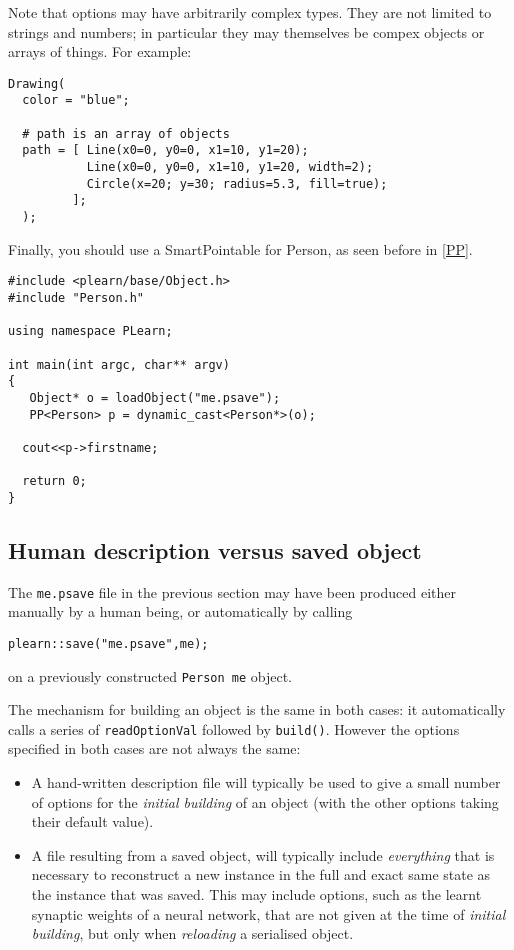 \documentclass[11pt]{book}
\begin{document}
Note that options may have arbitrarily complex types. They are not limited to strings and numbers; in particular they may
themselves be compex objects or arrays of things. For example:

\begin{verbatim}
Drawing(
  color = "blue";

  # path is an array of objects
  path = [ Line(x0=0, y0=0, x1=10, y1=20); 
           Line(x0=0, y0=0, x1=10, y1=20, width=2);
           Circle(x=20; y=30; radius=5.3, fill=true);
         ];
  );
\end{verbatim}

Finally, you should use a SmartPointable for Person, as seen before in \ref{PP}.

\begin{verbatim}
#include <plearn/base/Object.h>
#include "Person.h"

using namespace PLearn;

int main(int argc, char** argv)
{
   Object* o = loadObject("me.psave"); 
   PP<Person> p = dynamic_cast<Person*>(o);

  cout<<p->firstname;

  return 0;
}
\end{verbatim}


\subsection{Human description versus saved object} 

The {\tt me.psave} file in the previous section may have been produced
either manually by a human being, or automatically by calling 
\begin{verbatim}
plearn::save("me.psave",me);
\end{verbatim}
on a previously constructed {\tt Person me} object.

The mechanism for building an object is the same in both cases: it automatically calls a series of {\tt readOptionVal} followed by {\tt build()}. However the options specified in both cases are not always the same:

\begin{itemize}
\item A hand-written description file will typically be used to give a small number of options for the {\em initial building} of an object (with the other options taking their default value).
\item A file resulting from a saved object, will typically include {\em everything} that is necessary to reconstruct a new instance in the full and exact same state as the instance that was saved. This may include options, such as the learnt synaptic weights of a neural network, that are not given at the time of {\em initial building}, but only when {\em reloading} a serialised object.
\end{itemize}
\end{document}
